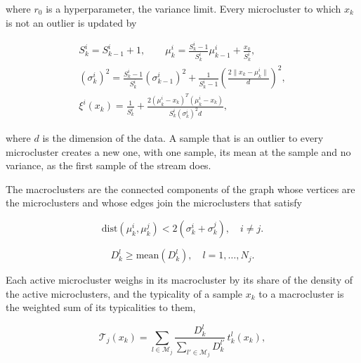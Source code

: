 where $r_0$ is a hyperparameter, the variance limit. Every microcluster to which $x_k$ is not an outlier is updated by

\begin{equation}
\begin{gathered}
    S^i_k = S^i_{k-1} + 1, \qquad
    \mu^i_k = \frac{S^i_k - 1}{S^i_k} \mu^i_{k-1} + \frac{x_k}{S^i_k}, \\
    \left(\sigma^i_k\right)^2 = \frac{S^i_k - 1}{S^i_k} \left(\sigma^i_{k-1}\right)^2 + \frac{1}{S^i_k - 1} \left( \frac{2\lVert x_k - \mu^i_k \rVert }{d} \right)^2, \\
    \xi^i(x_k) = \frac{1}{S^i_k} + \frac{2\left( \mu^i_k - x_k \right)^T \left( \mu^i_k - x_k \right)}{S^i_k \left( \sigma^i_k \right)^2d},
\end{gathered} \label{critique:dimensionality_penalty}
\end{equation}

where $d$ is the dimension of the data. A sample that is an outlier to every microcluster creates a new one, with one sample, its mean at the sample and no variance, as the first sample of the stream does.

The macroclusters are the connected components of the graph whose vertices are the microclusters and whose edges join the microclusters that satisfy

\begin{equation}
    \text{dist}(\mu^i_k, \mu^j_k) < 2 \left( \sigma^i_k + \sigma^j_k \right), \quad i \neq j. \label{eq:microcluster_intersection_condition}
\end{equation}


\begin{equation}
    D^l_k \ge \text{mean}\left(D^l_k\right), \quad l = 1,\dots,N_j. \label{critique:use_of_unstable_density}
\end{equation}

Each active microcluster weighs in its macrocluster by its share of the density of the active microclusters, and the typicality of a sample $x_k$ to a macrocluster is the weighted sum of its typicalities to them,

\begin{equation}
    \mathcal{T}_j(x_k) = \sum_{l\in\mathcal{M}_j} \frac{D^l_k}{\sum_{l'\in\mathcal{M}_j} D^{l'}_k}\, t^l_k(x_k), \label{eq:macrocluster_typicality}
\end{equation}

